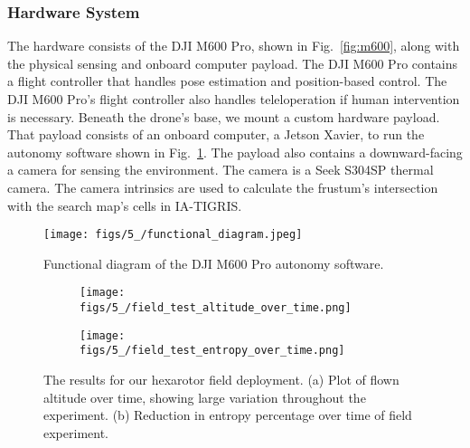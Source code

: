 \subsubsection{Hardware System}
The hardware consists of the DJI M600 Pro, shown in Fig.~\ref{fig:m600}, along with the physical sensing and onboard computer payload. The DJI M600 Pro contains a flight controller that handles pose estimation and position-based control. The DJI M600 Pro’s flight controller also handles teleloperation if human intervention is necessary. Beneath the drone's base, we mount a custom hardware payload.
That payload consists of an onboard computer, a Jetson Xavier, to run the autonomy software shown in Fig.~\ref{fig:functional_diagram}.
The payload also contains a downward-facing a camera for sensing the environment. The camera is a Seek S304SP thermal camera.
The camera intrinsics are used to calculate the frustum's intersection with the search map's cells in IA-TIGRIS.

\begin{figure}[t]
\centering
\texttt{[image: figs/5\_/functional\_diagram.jpeg]}
\caption{Functional diagram of the DJI M600 Pro autonomy software.}
\label{fig:functional_diagram}
\end{figure}
\begin{figure}[b]
    \centering
    \begin{subfigure}[b]{0.48\columnwidth}
        \centering
        \texttt{[image: figs/5\_/field\_test\_altitude\_over\_time.png]}
        \caption{}
        \label{fig:m600_altitude_over_time}
    \end{subfigure}
    \begin{subfigure}[b]{0.48\columnwidth}
        \centering
        \texttt{[image: figs/5\_/field\_test\_entropy\_over\_time.png]}
        \caption{}
        \label{fig:m600_entropy_over_time}
    \end{subfigure}
    \caption{The results for our hexarotor field deployment. (a) Plot of flown altitude over time, showing large variation throughout the experiment. (b) Reduction in entropy percentage over time of field experiment.}
\end{figure}

